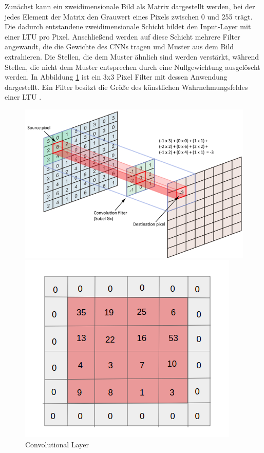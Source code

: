 Zunächst kann ein zweidimensionale Bild als Matrix dargestellt werden, bei der jedes Element der Matrix den Grauwert eines Pixels zwischen 0 und 255 trägt. Die dadurch entstandene zweidimensionale Schicht bildet den Input-Layer mit einer LTU pro Pixel. Anschließend werden auf diese Schicht mehrere Filter angewandt, die die Gewichte des CNNs tragen und Muster aus dem Bild extrahieren. Die Stellen, die dem Muster ähnlich sind werden verstärkt, während Stellen, die nicht dem Muster entsprechen durch eine Nullgewichtung ausgelöscht werden. In Abbildung \ref{convolutional_layer} ist ein 3x3 Pixel Filter mit dessen Anwendung dargestellt. Ein Filter besitzt die Größe des künstlichen Wahrnehmungsfeldes einer LTU \cite{AurelienGeron.2018}.

\begin{figure}
	\begin{minipage}[b]{.55\linewidth} %
		\includegraphics[width=\linewidth]{Bilder/convolutional_layer.png}
		\caption[Convolutional Layer]{Convolutional Layer \cite{DaphneCornelisse.20180424}}
		\label{convolutional_layer}
	\end{minipage}
	\hspace{.05\linewidth}%
	\begin{minipage}[b]{.4\linewidth} %
		\includegraphics[width=\linewidth]{Bilder/zero_padding.png}

\end{minipage}
\end{figure}
